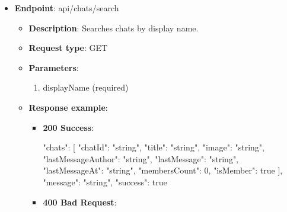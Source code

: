 \begin{itemize}
\begin{itemize}
\begin{itemize}
            \begin{spverbatim}
            {
                "errorMessage": "string",
                "errorDetails": "string",
                "statusCode": 0,
                "success": true
            }
            \end{spverbatim}
        \end{itemize}
        \item \textbf{Response messages}:
        \begin{enumerate}
            \item Success.
            \item Group not found.
        \end{enumerate}
    \end{itemize}

    \item \textbf{Endpoint}: api/chats/search
    \begin{itemize}
        \item \textbf{Description}: Searches chats by display name.
        \item \textbf{Request type}: GET
        \item \textbf{Parameters}:
        \begin{enumerate}
            \item displayName (required)
        \end{enumerate}
        \item \textbf{Response example}:
        \begin{itemize}
            \item \textbf{200 Success}:

            \begin{spverbatim}
            {
                "chats": [
                    {
                        "chatId": "string",
                        "title": "string",
                        "image": "string",
                        "lastMessageAuthor": "string",
                        "lastMessage": "string",
                        "lastMessageAt": "string",
                        "membersCount": 0,
                        "isMember": true
                    }
                ],
                "message": "string",
                "success": true
            }
            \end{spverbatim}

            \item \textbf{400 Bad Request}:


\end{itemize}
\end{itemize}
\end{itemize}
